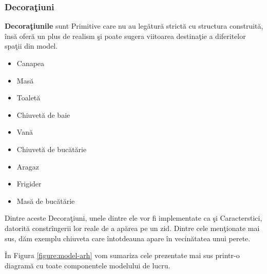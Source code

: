 \subsubsection{Decoraţiuni}
  
\begin{definition}
\textbf{Decoraţiunile} sunt Primitive care nu au legătură strictă cu structura 
construită, însă oferă un plus de realism şi poate sugera viitoarea destinaţie 
a diferitelor spaţii din model.
\end{definition}
  
\begin{itemize}
  \item Canapea
  \item Masă
  \item Toaletă
  \item Chiuvetă de baie
  \item Vană
  \item Chiuvetă de bucătărie
  \item Aragaz
  \item Frigider
  \item Masă de bucătărie
\end{itemize}

Dintre aceste Decoraţiuni, unele dintre ele vor fi implementate ca şi 
Caracterstici, datorită constrîngerii lor reale de a apărea pe un zid. Dintre 
cele menţionate mai sus, dăm exemplu chiuveta care întotdeauna apare în 
vecinătatea unui perete.

În Figura \ref{figure:model-arh} vom sumariza cele prezentate mai sus printr-o 
diagramă cu toate componentele modelului de lucru.

